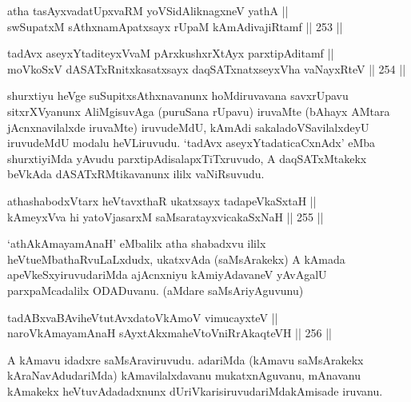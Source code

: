 
\begin{shl}
atha tasAyxvadatUpxvaRM yoVSidAliknagxneV yathA || \\
swSupatxM sAthxnamApatxsayx rUpaM kAmAdivajiRtamf \hfill || 253 ||  
\end{shl}

\begin{shl}
tadAvx aseyxYtaditeyxVvaM pArxkushxrXtAyx parxtipAditamf || \\
moVkoSxV dASATxRnitxkasatxsayx daqSATxnatxseyxVha vaNayxRteV \hfill || 254 ||   
\end{shl}

\begin{artha}
shurxtiyu heVge suSupitxsAthxnavanunx hoMdiruvavana savxrUpavu
sitxrXVyanunx AliMgisuvAga (puruSana rUpavu) iruvaMte (bAhayx AMtara
jAcnxnavilalxde iruvaMte) iruvudeMdU, kAmAdi sakaladoVSavilalxdeyU
iruvudeMdU modalu heVLiruvudu. `tadAvx aseyxYtadaticaCxnAdx' eMba shurxtiyiMda yAvudu
parxtipAdisalapxTiTxru\-vudo, A daqSATxMtakekx beVkAda dASATxRMtikavanunx ililx vaNiRsuvudu.
\end{artha}

\begin{shl}
athashabodxV\s tarx heVtavxthaR ukatxsayx tadapeVkaSxtaH || \\
kAmeyxVva hi yatoV\s jasarxM saMsaratayxvicakaSxNaH \hfill || 255 ||  
\end{shl}

\begin{artha}
`athAkAmayamAnaH' eMbalilx atha shabadxvu ililx heVtu\break eMbathaRvuLaLxdudx,
ukatxvAda (saMsArakekx) A kAmada apeVkeSxyiruvudariMda ajAcnxniyu
kAmiyAdavaneV yAvAgalU parxpaMcadalilx ODADuvanu. (aMdare saMsAriyAguvunu)
\end{artha}

\begin{shl}
tadABxvaBAviheVtutAvxdatoV\s kAmoV vimucayxteV ||  \\
naroV\s kAmayamAnaH sAyxtAkxmaheVtoVniRrAkaqteVH \hfill || 256 ||  
\end{shl}

\begin{artha}
A kAmavu idadxre saMsAraviruvudu. adariMda (kAmavu saMsArakekx
kAraNavAdudariMda) kAmavilalxdavanu mukatxnAguvanu, mAnavanu kAmakekx
heVtuvAdadadxnunx dUriVkarisiruvudariMda\break kAmisade iruvanu.
\end{artha}


